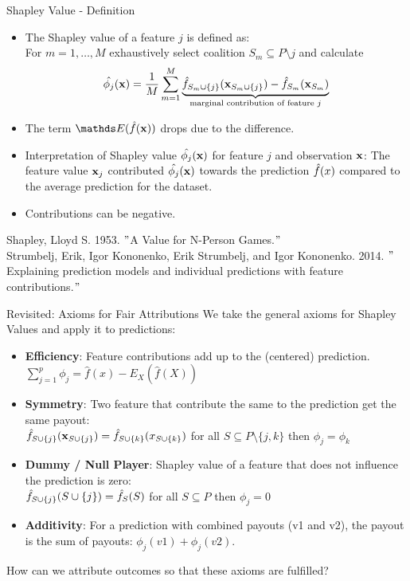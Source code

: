 \documentclass[11pt,compress,t,notes=noshow, xcolor=table]{beamer}
\begin{document}
\begin{vbframe}{Shapley Value - Definition}
\begin{itemize}
  \item The Shapley value of a feature $j$ is defined as:\\ 
  For $m = 1, \dots, M$ exhaustively select coalition $S_m \subseteq P \setminus j$  and calculate
    $$ \hat{\phi_{j}}(\xv) = \frac{1}{M} \sum_{m=1}^{M} \underbrace{\fh_{S_m \cup \{j \}}(\xv_{S_m \cup \{j \} }) - \fh_{S_m}(\xv_{S_m})}_{\text{marginal contribution of feature $j$}} $$
    \item The term $\E (\fh(\xv))$ drops due to the difference.
  \item Interpretation of Shapley value $\hat{\phi_{j}}(\xv)$ for feature $j$ and observation $\xv$: 
  The feature value $\xv_{j}$ contributed $\hat{\phi_{j}}(\xv)$ towards the prediction $\fh(x)$ compared to the average prediction for the dataset.
   \item Contributions can be negative.
\end{itemize}
\lz
\tiny
Shapley, Lloyd S. 1953. $"$A Value for N-Person Games.$"$\\
\vspace{0.2cm}
Strumbelj, Erik, Igor Kononenko, Erik Strumbelj, and Igor Kononenko. 2014. $"$Explaining prediction models and individual predictions with feature contributions.$"$

\end{vbframe}


\begin{vbframe}{Revisited: Axioms for Fair Attributions}
  We take the general axioms for Shapley Values and apply it to predictions:
  \begin{itemize}
    \item \textbf{Efficiency}: Feature contributions add up to the (centered) prediction.
      $\sum\nolimits_{j=1}^p\phi_j=\hat{f}(x)-E_X(\hat{f}(X))$
    \item \textbf{Symmetry}: Two feature that contribute the same to the prediction get the same payout: \\
      $\fh_{S\cup\{j\}}(\xv_{S\cup\{j\}}) = \fh_{S\cup\{k\}}(x_{S\cup\{k\}})$ for all $S \subseteq P\setminus\{j,k\}$ then $\phi_{j}=\phi_{k}$
    \item \textbf{Dummy / Null Player}: Shapley value of a feature that does not influence the prediction is zero: \\
      $\fh_{S\cup\{j\}}(S\cup\{j\})=\fh_{S}(S)$ for all $S \subseteq P$ then $\phi_j=0$
    \item \textbf{Additivity}:  For a prediction with combined payouts (v1 and v2), the
      payout is the sum of payouts: $\phi_j(v1) + \phi_j(v2)$.
  \end{itemize}
How can we attribute outcomes so that these axioms are fulfilled?
\end{vbframe}
\end{document}
